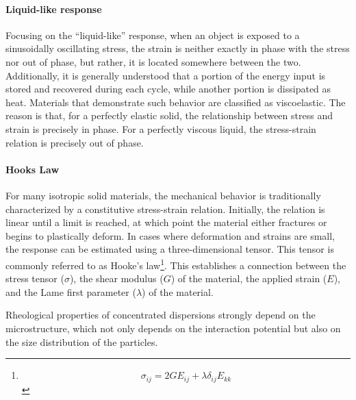 \paragraph{Liquid-like response} Focusing on the ``liquid-like'' response, when an object is exposed to a sinusoidally oscillating stress, the strain is neither exactly in phase with the stress nor out of phase, but rather, it is located somewhere between the two.
Additionally, it is generally understood that a portion of the energy input is stored and recovered during each cycle, while another portion is dissipated as heat.
Materials that demonstrate such behavior are classified as viscoelastic.
The reason is that, for a perfectly elastic solid, the relationship between stress and strain is precisely in phase.
For a perfectly viscous liquid, the stress-strain relation is precisely out of phase.



\paragraph{Hooks Law} For many isotropic solid materials, the mechanical behavior is traditionally characterized by a constitutive stress-strain relation.
Initially, the relation is linear until a limit is reached, at which point the material either fractures or begins to plastically deform.
In cases where deformation and strains are small, the response can be estimated using a three-dimensional tensor. 
This tensor is commonly referred to as Hooke's law\footnote{\[\sigma_{ij}=2GE_{ij}+\lambda\delta_{ij}E_{kk}\]}.
This establishes a connection between the stress tensor ($\sigma$), the shear modulus ($G$) of the material, the applied strain ($E$), and the Lame first parameter ($\lambda$) of the material\citep{bonyadiReviewFrictionLubrication2020}.


Rheological properties of concentrated dispersions strongly depend on the microstructure, which not only depends on the interaction potential but also on the size distribution of the particles\citep{senffTemperatureSensitiveMicrogel1999}.

